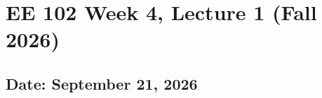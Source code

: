 \documentclass{ee102_notes}
\renewcommand{\releasedate}{September 21, 2026}
\begin{document}
\section*{EE 102 Week 4, Lecture 1 (Fall 2026)}
\subsection*{Date: \releasedate}
\tableofcontents

\end{document}
